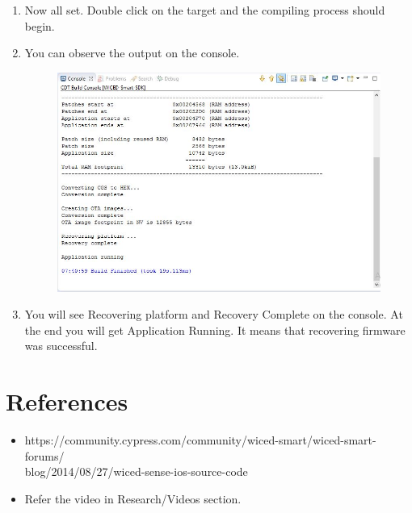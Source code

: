 \documentclass[11pt,a4paper]{article}
\begin{document}
\begin{enumerate}
	   \newpage
    \item Now all set. Double click on the target and the compiling process should begin.
    \item You can observe the output on the console.
    
    \begin{figure}[h]
        \centering
    	\includegraphics[scale=0.5]{recovery_complete.JPG}
	    \end{figure}
	    
    \item You will see Recovering platform and Recovery Complete on the console. At the end you will get Application Running. It means that recovering firmware was successful.

 
 	\end{enumerate}
 
 \newpage
	\section{References}
	 \begin{itemize}
	 \item https://community.cypress.com/community/wiced-smart/wiced-smart-forums/\\blog/2014/08/27/wiced-sense-ios-source-code
	 \item Refer the video in Research/Videos section.
	    \end{itemize}
 
 
\end{document}
